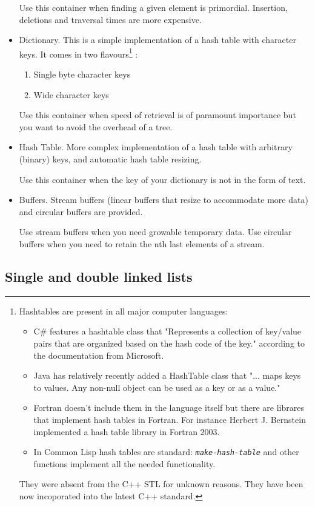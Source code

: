 \documentclass[12pt,a4paper]{memoir} %
\newcommand{\param}[1]{
\texttt{\textsl{#1}}
}
\begin{document}
\begin{itemize}
Use this container when finding a given element is primordial. Insertion, deletions and traversal times are more expensive.
\item
Dictionary. This is a simple implementation of a hash table with character keys. It comes in two flavours\footnote{
Hashtables are present in all major computer languages:
\begin{itemize}
\item C\# features a hashtable class that "Represents a collection of key/value pairs that are organized based on the hash code of the key." 
according to the documentation from Microsoft.
\item Java has relatively recently added a HashTable class that "... maps keys to values. Any non-null object can be used as a key or as a value."
\item Fortran doesn't include them in the language itself but there are librares that implement hash tables in Fortran. For instance 
Herbert J. Bernstein implemented a hash table library in Fortran 2003.
\item In Common Lisp hash tables are standard: \param{make-hash-table} and other functions implement all the needed functionality.
\end{itemize}
They were absent from the C++ STL for unknown reasons. They have been now incoporated into the latest C++ standard.
}
: 
\begin{enumerate}
\item Single byte character keys
\item Wide character keys
\end{enumerate}

Use this container when speed of retrieval is of paramount importance but you want to avoid the overhead of a tree.
\item
Hash Table. More complex implementation of a hash table with arbitrary (binary) keys, and automatic hash table resizing.

Use this container when the key of your dictionary is not in the form of text.
\item Buffers. Stream buffers (linear buffers that resize to accommodate more data) and circular buffers are provided.

Use stream buffers when you need growable temporary data. Use circular buffers when you need to retain the nth last elements of a stream.
\end{itemize}
\subsection{ Single and double linked lists}
\end{document}
